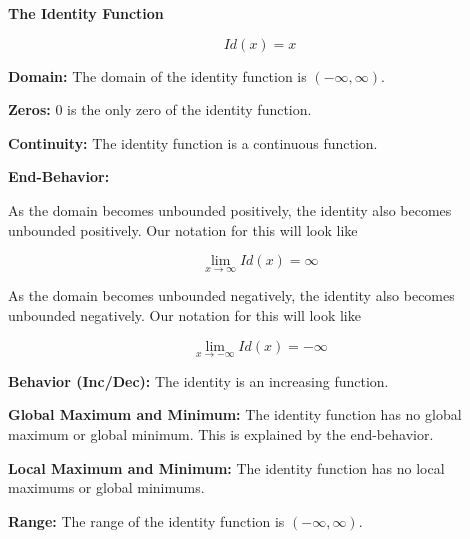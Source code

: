 \documentclass{ximera}
\begin{document}
\begin{explanation} \textbf{\textcolor{red!75!green}{The Identity Function}} 


\[ Id(x) = x  \]



\textbf{Domain:} The domain of the identity function is $(-\infty, \infty)$.

\textbf{Zeros:} $0$ is the only zero of the identity function.

\textbf{Continuity:} The identity function is a continuous function.

\textbf{End-Behavior:} 

As the domain becomes unbounded positively, the identity also becomes unbounded positively.  Our notation for this will look like

\[
\lim\limits_{x \to \infty} Id(x) = \infty
\]

As the domain becomes unbounded negatively, the identity also becomes unbounded negatively.  Our notation for this will look like

\[
\lim\limits_{x \to -\infty} Id(x) = -\infty
\]




\textbf{Behavior (Inc/Dec):} The identity is an increasing function.

\textbf{Global Maximum and Minimum:} The identity function has no global maximum or global minimum.  This is explained by the end-behavior.




\textbf{Local Maximum and Minimum:}  The identity function has no local maximums or global minimums. 

\textbf{Range:} The range of the identity function is $(-\infty, \infty)$.

\end{explanation}
\end{document}
